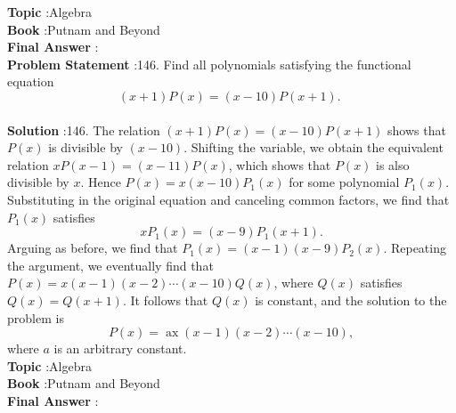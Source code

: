 \documentclass[10pt]{article}
\begin{document}
\textbf{Topic} :Algebra\\
\textbf{Book} :Putnam and Beyond\\
\textbf{Final Answer} :\\


\textbf{Problem Statement} :146. Find all polynomials satisfying the functional equation$$ (x+1) P(x)=(x-10) P(x+1) \text {. } $$\\
\textbf{Solution} :146. The relation $(x+1) P(x)=(x-10) P(x+1)$ shows that $P(x)$ is divisible by $(x-10)$. Shifting the variable, we obtain the equivalent relation $x P(x-1)=(x-11) P(x)$, which shows that $P(x)$ is also divisible by $x$. Hence $P(x)=x(x-10) P_{1}(x)$ for some polynomial $P_{1}(x)$. Substituting in the original equation and canceling common factors, we find that $P_{1}(x)$ satisfies $$ x P_{1}(x)=(x-9) P_{1}(x+1) . $$Arguing as before, we find that $P_{1}(x)=(x-1)(x-9) P_{2}(x)$. Repeating the argument, we eventually find that $P(x)=x(x-1)(x-2) \cdots(x-10) Q(x)$, where $Q(x)$ satisfies $Q(x)=Q(x+1)$. It follows that $Q(x)$ is constant, and the solution to the problem is$$ P(x)=\operatorname{ax}(x-1)(x-2) \cdots(x-10), $$where $a$ is an arbitrary constant.\\
\textbf{Topic} :Algebra\\
\textbf{Book} :Putnam and Beyond\\
\textbf{Final Answer} :\\
\end{document}
